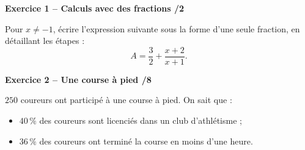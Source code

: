 \documentclass[10pt,a4paper]{article}
\begin{document}

\textbf{Exercice 1 -- Calculs avec des fractions \hfill /2}

Pour \(x\neq-1\), écrire l'expression suivante sous la forme d'une seule fraction, en détaillant les étapes :
\[
A=\dfrac{3}{2}+\dfrac{x+2}{x+1}.
\]

\vspace{2.3cm}

\textbf{Exercice 2 -- Une course à pied \hfill /8}

\(250\) coureurs ont participé à une course à pied. On sait que :
\begin{itemize}
\item \(40\,\%\) des coureurs sont licenciés dans un club d'athlétisme ;
\item \(36\,\%\) des coureurs ont terminé la course en moins d'une heure.
\end{itemize}
\end{document}
